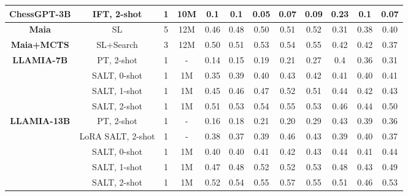\documentclass{article}
\newcommand{\valbest}[1]{\colorbox{valbest}{#1}}
\newcommand{\valgood}[1]{\colorbox{valgood}{#1}}
\theoremstyle{plain}
\theoremstyle{definition}
\theoremstyle{remark}
\begin{document}
\begin{table}[!h]
\begin{adjustbox}{max width=0.99\textwidth}
\begin{tabular}{c|ccc|ccccc|ccc}
        \textbf{ChessGPT-3B\cite{feng2024chessgpt}} & IFT, 2-shot & 1 & 10M & 0.1 & 0.1 & 0.05 & 0.07 & 0.09 & 0.23 & 0.1 & 0.07\\\midrule
        \textbf{Maia\cite{mcilroy2020aligning}} & SL & 5 & 12M & 0.46 & 0.48 & 0.50 & 0.51 & 0.52 & 0.31 & 0.38 & 0.40 \\
        \textbf{Maia+MCTS\cite{jacob2022modeling}} & SL+Search & 3 & 12M & 0.50 & 0.51 & 0.53 & 0.54 & \valbest{0.55} & 0.42 & 0.42 & 0.37 \\\midrule
        \multirow{4}{*}{\textbf{LLAMIA-7B}} & PT, 2-shot & 1 & - & 0.14 & 0.15 & 0.19 & 0.21 & 0.27 & 0.4 & 0.36 & 0.31\\
        & SALT, 0-shot & 1 & 1M & 0.35 & 0.39  & 0.40 & 0.43 & 0.42 & 0.41 & 0.40 & 0.41 \\
         & SALT, 1-shot & 1 & 1M & 0.45 & 0.46  & 0.47 & 0.52 & 0.51 & 0.44 & 0.42 & 0.43 \\
        & SALT, 2-shot & 1 & 1M & \valgood{0.51} & \valgood{0.53}  & \valgood{0.54} & \valgood{0.55} & 0.53 & 0.46 & \valgood{0.44} & \valgood{0.50} \\\midrule
        \multirow{5}{*}{\textbf{ LLAMIA-13B}} & PT, 2-shot & 1 & - & 0.16 & 0.18 & 0.21 & 0.20 & 0.29 & 0.43 & 0.39 & 0.36\\
         & LoRA SALT, 2-shot & 1 & - & 0.38 & 0.37 & 0.39 & 0.46 & 0.43 & 0.39 & 0.40 & 0.37\\
        & SALT, 0-shot & 1 & 1M & 0.40 & 0.40  & 0.41 & 0.42 & 0.43 & 0.44 & 0.41 & 0.44 \\
         & SALT, 1-shot & 1 & 1M & 0.47 & 0.48  & 0.52 & 0.52 & 0.53 & \valgood{0.48} & 0.43 & 0.49 \\
        & SALT, 2-shot & 1 & 1M & \valbest{0.52} & \valbest{0.54}  & \valbest{0.55} & \valbest{0.57} & \valbest{0.55} & \valbest{0.51} & \valbest{0.46} & \valbest{0.53} \\
    \bottomrule[1.2pt]
    \end{tabular}
        \end{adjustbox}

\end{table}
\end{document}
